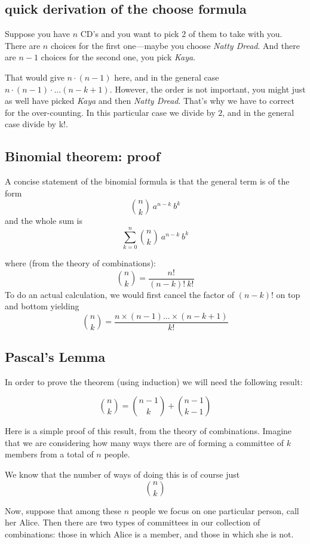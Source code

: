 \documentclass[11pt, oneside]{article}
\begin{document}
\label{sec:binomial_derivation}

\subsection*{quick derivation of the choose formula}
Suppose you have $n$ CD's and you want to pick 2 of them to take with you.  There are $n$ choices for the first one---maybe you choose \emph{Natty Dread}.  And there are $n-1$ choices for the second one, you pick \emph{Kaya}.

That would give $n \cdot (n-1)$ here, and in the general case $n \cdot (n-1) \cdot \dots (n-k+1)$.  However, the order is not important, you might just as well have picked \emph{Kaya} and then \emph{Natty Dread}.  That's why we have to correct for the over-counting.  In this particular case we divide by $2$, and in the general case divide by k!.

\subsection*{Binomial theorem:  proof}
A concise statement of the binomial formula is that the general term is of the form
\[ {{n}\choose{k}} \ a^{n-k} \ b^k  \]
and the whole sum is
\[ \sum_{k=0}^{n} {{n}\choose{k}} \ a^{n-k} \ b^k  \]

where (from the theory of combinations):
\[  {{n}\choose{k}} = \frac{n!}{(n-k)! \ k!} \]
To do an actual calculation, we would first cancel the factor of $(n-k)!$ on top and bottom yielding
\[  {{n}\choose{k}} = \frac{n \times (n-1) \dots \times (n-k+1)}{k!} \]

\subsection*{Pascal's Lemma}
In order to prove the theorem (using induction) we will need the following result:

\[  {{n}\choose{k}} = {{n-1}\choose{k}} + {{n-1}\choose{k-1}} \]

Here is a simple proof of this result, from the theory of combinations.  Imagine that we are considering how many ways there are of forming a committee of $k$ members from a total of $n$ people.

We know that the number of ways of doing this is of course just
\[  {{n}\choose{k}} \]

Now, suppose that among these $n$ people we focus on one particular person, call her Alice.  Then there are two types of committees in our collection of combinations:  those in which Alice is a member, and those in which she is not.
\end{document}
